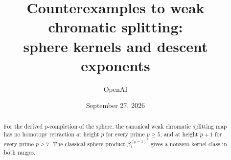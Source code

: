 \documentclass[11pt]{article}
\title{Counterexamples to weak chromatic splitting:\\
       sphere kernels and descent exponents}
\author{OpenAI}
\date{September 27, 2026}
\begin{document}
\maketitle
\begin{abstract}
For the derived \(p\)-completion of the sphere, the canonical weak chromatic
splitting map has no homotopy retraction at height \(p\) for every prime
\(p\geq5\), and at height \(p+1\) for every prime \(p\geq7\).
The classical sphere product \(\beta_1^{(p-1)^2}\) gives a nonzero
kernel class in both ranges.
\end{abstract}
\tableofcontents











\appendix

\clearpage
{}
{}


\end{document}
